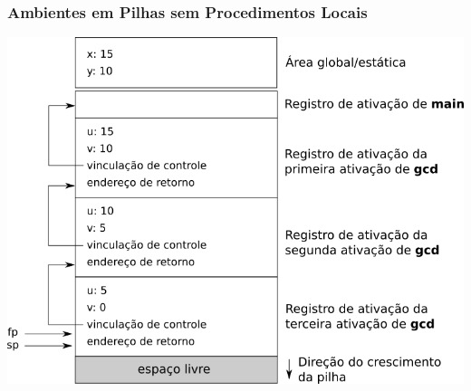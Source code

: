 \documentclass[table]{beamer}
\begin{document}
\begin{frame}
   \frametitle{Ambientes em Pilhas sem Procedimentos Locais}
   \begin{center}
   \includegraphics[scale=0.4]{figuras/ambientebaseadoempilhas01.png}
   \end{center}
\end{frame}
\end{document}
